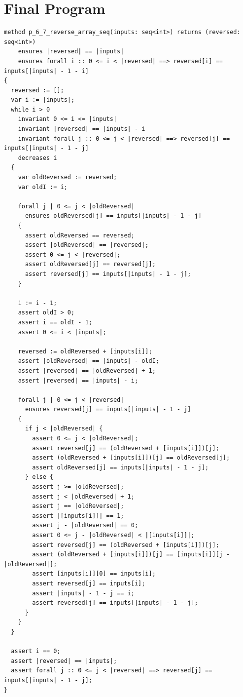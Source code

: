 \documentclass{article}
\begin{document}
\section*{Final Program}
\begin{lstlisting}
method p_6_7_reverse_array_seq(inputs: seq<int>) returns (reversed: seq<int>)
	ensures |reversed| == |inputs|
	ensures forall i :: 0 <= i < |reversed| ==> reversed[i] == inputs[|inputs| - 1 - i]
{
  reversed := [];
  var i := |inputs|;
  while i > 0
    invariant 0 <= i <= |inputs|
    invariant |reversed| == |inputs| - i
    invariant forall j :: 0 <= j < |reversed| ==> reversed[j] == inputs[|inputs| - 1 - j]
    decreases i
  {
    var oldReversed := reversed;
    var oldI := i;

    forall j | 0 <= j < |oldReversed|
      ensures oldReversed[j] == inputs[|inputs| - 1 - j]
    {
      assert oldReversed == reversed;
      assert |oldReversed| == |reversed|;
      assert 0 <= j < |reversed|;
      assert oldReversed[j] == reversed[j];
      assert reversed[j] == inputs[|inputs| - 1 - j];
    }

    i := i - 1;
    assert oldI > 0;
    assert i == oldI - 1;
    assert 0 <= i < |inputs|;

    reversed := oldReversed + [inputs[i]];
    assert |oldReversed| == |inputs| - oldI;
    assert |reversed| == |oldReversed| + 1;
    assert |reversed| == |inputs| - i;

    forall j | 0 <= j < |reversed|
      ensures reversed[j] == inputs[|inputs| - 1 - j]
    {
      if j < |oldReversed| {
        assert 0 <= j < |oldReversed|;
        assert reversed[j] == (oldReversed + [inputs[i]])[j];
        assert (oldReversed + [inputs[i]])[j] == oldReversed[j];
        assert oldReversed[j] == inputs[|inputs| - 1 - j];
      } else {
        assert j >= |oldReversed|;
        assert j < |oldReversed| + 1;
        assert j == |oldReversed|;
        assert |[inputs[i]]| == 1;
        assert j - |oldReversed| == 0;
        assert 0 <= j - |oldReversed| < |[inputs[i]]|;
        assert reversed[j] == (oldReversed + [inputs[i]])[j];
        assert (oldReversed + [inputs[i]])[j] == [inputs[i]][j - |oldReversed|];
        assert [inputs[i]][0] == inputs[i];
        assert reversed[j] == inputs[i];
        assert |inputs| - 1 - j == i;
        assert reversed[j] == inputs[|inputs| - 1 - j];
      }
    }
  }

  assert i == 0;
  assert |reversed| == |inputs|;
  assert forall j :: 0 <= j < |reversed| ==> reversed[j] == inputs[|inputs| - 1 - j];
}
\end{lstlisting}
\end{document}
